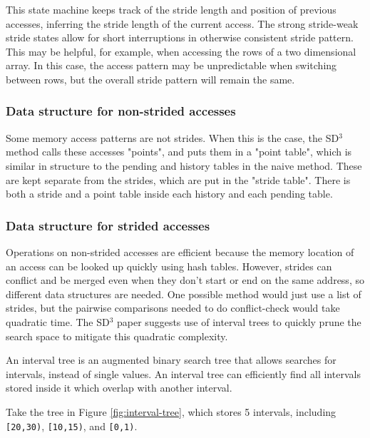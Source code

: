 \documentclass[12pt,twoside]{reedthesis}
\begin{document}
		This state machine keeps track of the stride length and position of previous accesses, inferring the stride length of the current access. The strong stride-weak stride states allow for short interruptions in otherwise consistent stride pattern. This may be helpful, for example, when accessing the rows of a two dimensional array. In this case, the access pattern may be unpredictable when switching between rows, but the overall stride pattern will remain the same. 
		
		\subsubsection{Data structure for non-strided accesses}
		
		Some memory access patterns are not strides. When this is the case, the SD$^3$ method calls these accesses "points", and puts them in a "point table", which is similar in structure to the pending and history tables in the naive method. These are kept separate from the strides, which are put in the "stride table". There is both a stride and a point table inside each history and each pending table. 
		
		\subsubsection{Data structure for strided accesses}
		
		Operations on non-strided accesses are efficient because the memory location of an access can be looked up quickly using hash tables. However, strides can conflict and be merged even when they don't start or end on the same address, so different data structures are needed. One possible method would just use a list of strides, but the pairwise comparisons needed to do conflict-check would take quadratic time. The SD$^3$ paper suggests use of interval trees to quickly prune the search space to mitigate this quadratic complexity.
		
		An interval tree is an augmented binary search tree that allows searches for intervals, instead of single values. An interval tree can efficiently find all intervals stored inside it which overlap with another interval. 
		
		Take the tree in Figure \ref{fig:interval-tree}, which stores 5 intervals, including \texttt{[20,30)}, \texttt{[10,15)}, and \texttt{[0,1)}. 
		
		
\end{document}
